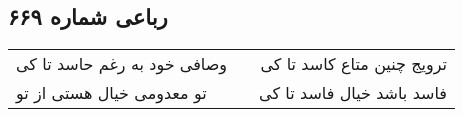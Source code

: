 \begin{center}
\section*{رباعی شماره ۶۶۹}
\label{sec:sh669}
\begin{longtable}{l p{0.5cm} r}
وصافی خود به رغم حاسد تا کی
&&
ترویج چنین متاع کاسد تا کی
\\
تو معدومی خیال هستی از تو
&&
فاسد باشد خیال فاسد تا کی
\\
\end{longtable}
\end{center}
